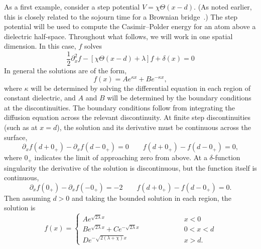 As a first example, consider a step potential $V=\chi\Theta(x-d)$.
(As noted earlier, this is closely related to the sojourn time for a Brownian bridge~\cite{Hooghiemstra2002}.)
The step potential will be used to compute the Casimir--Polder energy for an atom 
above a dielectric half-space.
Throughout what follows, we will work in one spatial dimension.  
In this case, $f$ solves
\begin{equation}
   \frac{1}{2}\partial_x^2 f - [\chi\Theta(x-d)+\lambda]f + \delta(x) =0
\end{equation}
In general the solutions are of the form, 
\begin{equation}
  f(x) = A e^{\kappa x} + B e^{-\kappa x},
\end{equation}
where $\kappa$ will be determined by solving the differential equation in each region of constant dielectric,
 and $A$ and $B$ will be determined by the boundary conditions at the discontinuities.
The boundary conditions follow from integrating the diffusion equation across the relevant discontinuity.  
At finite step discontinuities (such as at $x=d$), the solution and its derivative must be continuous across the surface,
\begin{equation}
  \partial_xf(d+0_+) - \partial_x f(d-0_+) = 0 \qquad f(d+0_+)-f(d-0_+) = 0,  \label{eq:step_BC}
\end{equation}
where $0_+$ indicates the limit of approaching zero from above.  
At a $\delta$-function singularity the derivative of the solution is discontinuous, but the function itself
is continuous,
\begin{equation}
  \partial_xf(0_+) -\partial_x f(-0_+) = -2  \qquad f(d+0_+)-f(d-0_+) = 0.\label{eq:delta_BC}
\end{equation}
Then assuming $d>0$ and taking the bounded solution in each region, the solution is 
\begin{equation}
  f(x) =\left\{ 
    \begin{array}{lcr}  A e^{\sqrt{2\lambda} x} & \hspace{2cm} & x<0\\
      B e^{\sqrt{2\lambda}x} + Ce^{-\sqrt{2\lambda}x} & \hspace{2cm} & 0<x<d\\
      D e^{-\sqrt{2(\lambda+\chi)}x} & \hspace{2cm} & x>d.
    \end{array}
  \right.
\end{equation}
